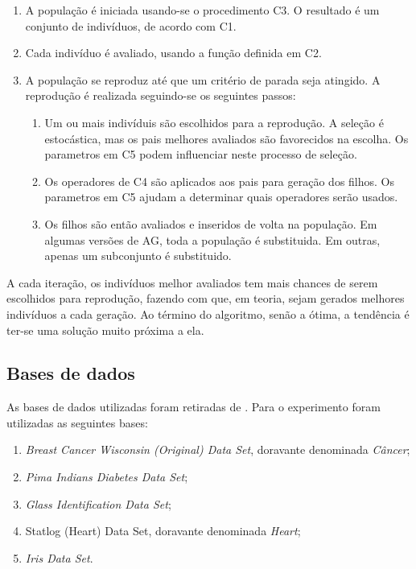 \documentclass[12pt]{article}
\begin{document}
\begin{enumerate}
	\item A população é iniciada usando-se o procedimento C3. O resultado é um conjunto de indivíduos, de acordo com C1.
	\item Cada indivíduo é avaliado, usando a função definida em C2.
	\item A população se reproduz até que um critério de parada seja atingido. A reprodução é realizada seguindo-se os seguintes passos:
	 \begin{enumerate}
		\item Um ou mais indivíduis são escolhidos para a reprodução. A seleção é estocástica, mas os pais melhores avaliados são favorecidos na escolha. Os parametros em C5 podem influenciar neste processo de seleção.
		\item Os operadores de C4 são aplicados aos pais para geração dos filhos. Os parametros em C5 ajudam a determinar quais operadores serão usados.
		\item Os filhos são então avaliados e inseridos de volta na população. Em algumas versões de AG, toda a população é substituida. Em outras, apenas um subconjunto é substituido.		
	\end{enumerate}
\end{enumerate}

\par A cada iteração, os indivíduos melhor avaliados tem mais chances de serem escolhidos para reprodução, fazendo com que, em teoria, sejam gerados melhores indivíduos a cada geração. Ao término do algoritmo, senão a ótima, a tendência é ter-se uma solução muito próxima a ela.


\subsection{Bases de dados}

\par As bases de dados utilizadas foram retiradas de \cite{frank}. Para o experimento foram utilizadas as seguintes bases:

\begin{enumerate}
	\item \textit{Breast Cancer Wisconsin (Original) Data Set}, doravante denominada \textit{Câncer};
	\item \textit{Pima Indians Diabetes Data Set};
	\item \textit{Glass Identification Data Set};
	\item Statlog (Heart) Data Set, doravante denominada \textit{Heart};
	\item \textit{Iris Data Set}.
\end{enumerate}
\end{document}
